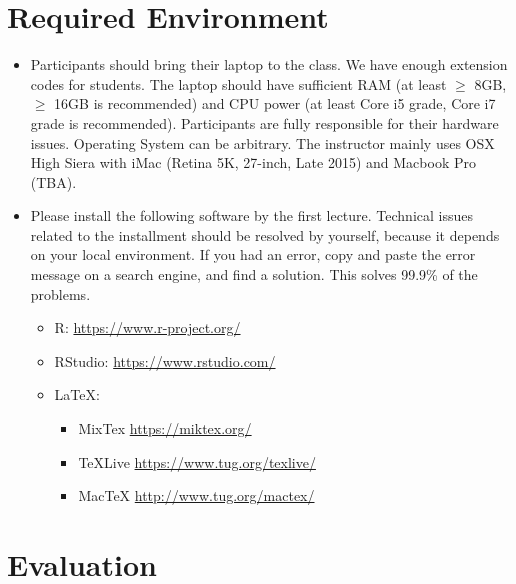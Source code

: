 \documentclass[]{book}
\providecommand{\tightlist}{%
  \setlength{\itemsep}{0pt}\setlength{\parskip}{0pt}}
\theoremstyle{definition}
\theoremstyle{definition}
\theoremstyle{definition}
\theoremstyle{remark}
\begin{document}
\section{Required Environment}\label{required-environment}

\begin{itemize}
\tightlist
\item
  Participants should bring their laptop to the class. We have enough
  extension codes for students. The laptop should have sufficient RAM
  (at least \(\ge\) 8GB, \(\ge\) 16GB is recommended) and CPU power (at
  least Core i5 grade, Core i7 grade is recommended). Participants are
  fully responsible for their hardware issues. Operating System can be
  arbitrary. The instructor mainly uses OSX High Siera with iMac (Retina
  5K, 27-inch, Late 2015) and Macbook Pro (TBA).
\item
  Please install the following software by the first lecture. Technical
  issues related to the installment should be resolved by yourself,
  because it depends on your local environment. If you had an error,
  copy and paste the error message on a search engine, and find a
  solution. This solves 99.9\% of the problems.

  \begin{itemize}
  \tightlist
  \item
    R: \url{https://www.r-project.org/}
  \item
    RStudio: \url{https://www.rstudio.com/}
  \item
    LaTeX:

    \begin{itemize}
    \tightlist
    \item
      MixTex \url{https://miktex.org/}
    \item
      TeXLive \url{https://www.tug.org/texlive/}
    \item
      MacTeX \url{http://www.tug.org/mactex/}
    \end{itemize}
  \end{itemize}
\end{itemize}

\section{Evaluation}\label{evaluation}
\end{document}
